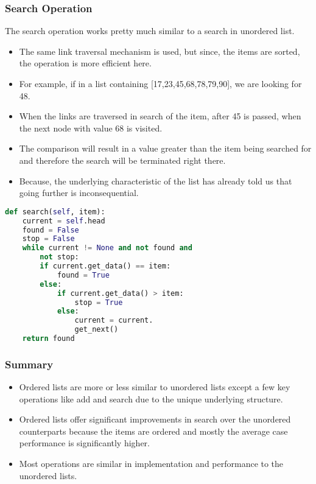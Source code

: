 \documentclass{beamer}
\begin{document}
\begin{frame}
\frametitle{Search Operation}

The search operation works pretty much similar to a search in unordered list.

\begin{itemize}
\item The same link traversal mechanism is used, but since, the items are sorted, the  operation is more efficient here.

\item For example, if in a list containing [17,23,45,68,78,79,90], we are looking for 48.

\item When the links are traversed in search of the item, after 45 is passed, when the next node with value 68 is visited.

\item The comparison will result in a value greater than the item being searched for and therefore the search will be terminated right there.

\item Because, the underlying characteristic of the list has already told us that going further is inconsequential. 
\end{itemize}
\end{frame}

\begin{frame}[fragile]
\begin{lstlisting}[language=Python]
def search(self, item):
	current = self.head
	found = False
	stop = False
	while current != None and not found and
	 	not stop:
		if current.get_data() == item:
			found = True
		else:
			if current.get_data() > item:
				stop = True
			else:
				current = current.
				get_next()
	return found
\end{lstlisting}
\end{frame}


\begin{frame}
\frametitle{Summary}
\begin{itemize}
\item Ordered lists are more or less similar to unordered lists except a few key operations like add and search due to the unique underlying structure.
\item Ordered lists offer significant improvements in search over the unordered counterparts because the items are ordered and mostly the average case performance is significantly higher.
\item Most operations are similar  in implementation and performance to the unordered lists.
\end{itemize}
\end{frame}
\end{document}
